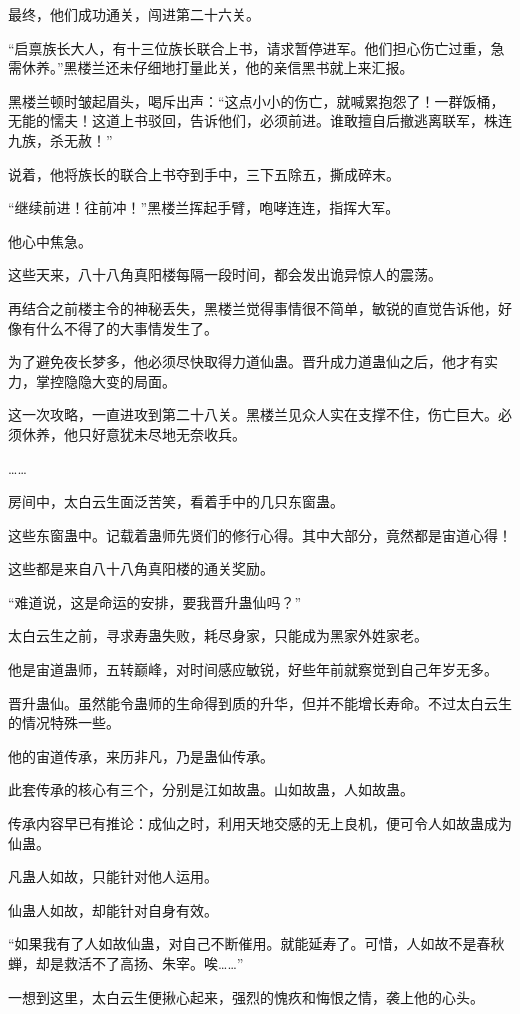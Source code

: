 \begin{this_body}
最终，他们成功通关，闯进第二十六关。

“启禀族长大人，有十三位族长联合上书，请求暂停进军。他们担心伤亡过重，急需休养。”黑楼兰还未仔细地打量此关，他的亲信黑书就上来汇报。

黑楼兰顿时皱起眉头，喝斥出声：“这点小小的伤亡，就喊累抱怨了！一群饭桶，无能的懦夫！这道上书驳回，告诉他们，必须前进。谁敢擅自后撤逃离联军，株连九族，杀无赦！”

说着，他将族长的联合上书夺到手中，三下五除五，撕成碎末。

“继续前进！往前冲！”黑楼兰挥起手臂，咆哮连连，指挥大军。

他心中焦急。

这些天来，八十八角真阳楼每隔一段时间，都会发出诡异惊人的震荡。

再结合之前楼主令的神秘丢失，黑楼兰觉得事情很不简单，敏锐的直觉告诉他，好像有什么不得了的大事情发生了。

为了避免夜长梦多，他必须尽快取得力道仙蛊。晋升成力道蛊仙之后，他才有实力，掌控隐隐大变的局面。

这一次攻略，一直进攻到第二十八关。黑楼兰见众人实在支撑不住，伤亡巨大。必须休养，他只好意犹未尽地无奈收兵。

……

房间中，太白云生面泛苦笑，看着手中的几只东窗蛊。

这些东窗蛊中。记载着蛊师先贤们的修行心得。其中大部分，竟然都是宙道心得！

这些都是来自八十八角真阳楼的通关奖励。

“难道说，这是命运的安排，要我晋升蛊仙吗？”

太白云生之前，寻求寿蛊失败，耗尽身家，只能成为黑家外姓家老。

他是宙道蛊师，五转巅峰，对时间感应敏锐，好些年前就察觉到自己年岁无多。

晋升蛊仙。虽然能令蛊师的生命得到质的升华，但并不能增长寿命。不过太白云生的情况特殊一些。

他的宙道传承，来历非凡，乃是蛊仙传承。

此套传承的核心有三个，分别是江如故蛊。山如故蛊，人如故蛊。

传承内容早已有推论：成仙之时，利用天地交感的无上良机，便可令人如故蛊成为仙蛊。

凡蛊人如故，只能针对他人运用。

仙蛊人如故，却能针对自身有效。

“如果我有了人如故仙蛊，对自己不断催用。就能延寿了。可惜，人如故不是春秋蝉，却是救活不了高扬、朱宰。唉……”

一想到这里，太白云生便揪心起来，强烈的愧疚和悔恨之情，袭上他的心头。


\end{this_body}
